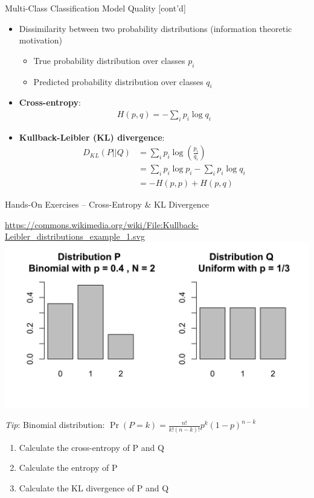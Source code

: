 \documentclass[ignorenonframetext,xcolor=x11names]{beamer}
\begin{document}
\begin{frame}{Multi-Class Classification Model Quality \small [cont'd]}
\begin{itemize}
  \item Dissimilarity between two probability distributions (information theoretic motivation)
  \begin{itemize}
     \item True probability distribution over classes $p_i$
     \item Predicted probability distribution over classes $q_i$
  \end{itemize}
  \item \textbf{Cross-entropy}: 
\begin{align*}
H(p, q) = - \sum_i p_i \log q_i
\end{align*}
  \item \textbf{Kullback-Leibler (KL) divergence}:
\begin{align*}
D_{KL}(P || Q) &= \sum_i p_i \log \left( \frac{p_i}{q_i} \right) \\
  & = \sum_i p_i \log p_i - \sum_i p_i \log q_i \\
  & = - H(p, p) + H(p, q)
\end{align*}
\end{itemize}
\end{frame}

\begin{frame}{Hands-On Exercises -- Cross-Entropy \& KL Divergence}
\begin{center}
\vspace{-3mm} \tiny \url{https://commons.wikimedia.org/wiki/File:Kullback-Leibler_distributions_example_1.svg}
\normalsize
\includegraphics[width=.8\textwidth]{kl.png} \\
\end{center}

\vspace{-8mm}
\emph{Tip}: Binomial distribution: $\Pr(P=k) = \frac{n!}{k!(n-k)!} p^k (1-p)^{n-k}$ \\

\begin{enumerate}
   \item Calculate the cross-entropy of P and Q
   \item Calculate the entropy of P
   \item Calculate the KL divergence of P and Q
\end{enumerate}
\end{frame}
\end{document}
